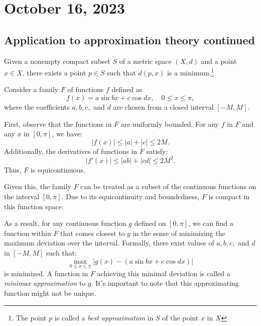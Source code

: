 \newpage
\section{October 16, 2023}
\subsection{Application to approximation theory continued}
\begin{theorem}
    Given a nonempty compact subset $S$ of a metric space $(X,d)$
    and a point $x \in X$, there exists a point $p \in S$ such that $d(p,x)$ is a minimum.\footnote{The point $p$ is called a \textit{best approximation} in $S$ of the point $x$ in $X$}
\end{theorem}

\begin{example}
    Consider a family \( F \) of functions \( f \) defined as
    \[
    f(x) = a \sin bx + c \cos dx, \quad 0 \leq x \leq \pi,
    \]
    where the coefficients \( a, b, c, \) and \( d \) are chosen from a closed interval \([-M, M]\).
    
    First, observe that the functions in \( F \) are uniformly bounded. For any \( f \) in \( F \) and any \( x \) in \([0, \pi]\), we have:
    \[
    |f(x)| \leq |a| + |c| \leq 2M.
    \]
    Additionally, the derivatives of functions in \( F \) satisfy:
    \[
    |f'(x)| \leq |ab| + |cd| \leq 2M^2.
    \]
    Thus, \( F \) is equicontinuous.
    
    Given this, the family \( F \) can be treated as a subset of the continuous functions on the interval \([0, \pi]\). Due to its equicontinuity and boundedness, \( F \) is compact in this function space.
    
    As a result, for any continuous function \( g \) defined on \([0, \pi]\), we can find a function within \( F \) that comes closest to \( g \) in the sense of minimizing the maximum deviation over the interval. Formally, there exist values of \( a, b, c, \) and \( d \) in \([-M, M]\) such that:
    \[
    \max_{0 \leq x \leq \pi} |g(x) - (a \sin bx + c \cos dx)|
    \]
    is minimized. A function in \( F \) achieving this minimal deviation is called a \textit{minimax approximation} to \( g \). It's important to note that this approximating function might not be unique.

\end{example}

